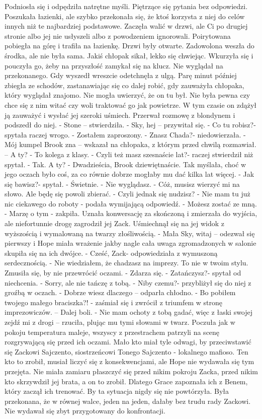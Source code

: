 \documentclass[12pt,a4paper]{book}
\begin{document}
Podniosła się i odpędziła natrętne myśli. Piętrzące się pytania bez odpowiedzi. Poszukała łazienki, ale szybko przekonała się, że ktoś korzysta z niej do celów innych niż te najbardziej podstawowe. Zaczęła walić w drzwi, ale Ci po drugiej stronie albo jej nie usłyszeli albo z powodzeniem ignorowali. Poirytowana pobiegła na górę i trafiła na łazienkę. Drzwi były otwarte. Zadowolona weszła do środka, ale nie była sama. Jakiś chłopak sikał, lekko się chwiejąc. Wkurzyła się i pouczyła go, żeby na przyszłość zamykał się na klucz. Nie wyglądał na przekonanego. Gdy wyszedł wreszcie odetchnęła z ulgą. Parę minut później zbiegła ze schodów, zastanawiając się co dalej robić, gdy zauważyła chłopaka, który wyglądał znajomo. Nie mogła uwierzyć, że on tu był. Nie była pewna czy chce się z nim witać czy woli traktować go jak powietrze. W tym czasie on zdążył ją zauważyć i wysłać jej szeroki uśmiech. Przerwał rozmowę z blondynem i podszedł do niej. 
- Stone – stwierdziła. 
- Sky, hej – przywitał się.
- Co tu robisz?- spytała raczej wrogo. 
- Zostałem zaproszony. 
- Znasz Chada?- niedowierzała.
- Mój kumpel Brook zna – wskazał na chłopaka, z którym przed chwilą rozmawiał. – A ty?
- To kolega z klasy. 
- Czyli też masz szesnaście lat?- raczej stwierdził niż spytał. 
- Tak. A ty?
- Dwadzieścia, Brook dziewiętnaście. 
Tak myślała, choć w jego oczach było coś, za co równie dobrze mogłaby mu dać kilka lat więcej. 
- Jak się bawisz?- spytał. 
- Świetnie. 
- Nie wyglądasz.
- Cóż, musisz wierzyć mi na słowo. Ale będę się powoli zbierać. 
- Czyli jednak się nudzisz?
- Nie mam tu już nic ciekawego do roboty - podała wymijającą odpowiedź.
- Możesz zostać ze mną. 
- Marzę o tym - zakpiła.
Uznała konwersację za skończoną i zmierzała do wyjścia, ale niefortunnie drogę zagrodził jej Zack. Uśmiechnął się na jej widok z wyższością i wymalowaną na twarzy złośliwością. 
- Mała Sky, witaj – odezwał się pierwszy i Hope miała wrażenie jakby nagle cała uwaga zgromadzonych w salonie skupiła się na ich dwójce. 
- Cześć, Zack- odpowiedziała z wymuszoną serdecznością. 
- Nie wiedziałem, że chadzasz na imprezy. To nie w twoim stylu. 
Zmusiła się, by nie przewrócić oczami. 
- Zdarza się. 
- Zatańczysz?- spytał od niechcenia. 
- Sorry, ale nie tańczę z tobą. 
- Niby czemu?- przybliżył się do niej z groźbą w oczach.
- Dobrze wiesz dlaczego – odparła chłodno. 
- Bo pobiłem twojego małego braciszka?! - zaśmiał się i zwrócił z triumfem w stronę imprezowiczów. – Dalej boli.
- Nie mam ochoty z tobą gadać, więc z łaski swojej zejdź mi z drogi – rzuciła, plując mu tymi słowami w twarz. 
Poczuła jak w pokoju temperatura maleje, wszyscy z przestrachem patrzyli na scenę rozgrywającą się przed ich oczami. Mało kto miał tyle odwagi, by przeciwstawić się Zackowi Sajczento, siostrzeńcowi Tonego Sajczento - lokalnego mafioso. Ten kto to zrobił, musiał liczyć się z konsekwencjami, ale Hope nie wydawała się tym przejęta. Nie miała zamiaru płaszczyć się przed nikim pokroju Zacka, przed nikim kto skrzywdził jej brata, a on to zrobił. Dlatego Grace zapoznała ich z Benem, który zaczął ich trenować. By ta sytuacja nigdy się nie powtórzyła. Była przekonana, że w równej walce, jeden na jeden, dałaby bez trudu rady Zackowi. Nie wydawał się zbyt przygotowany do konfrontacji. 
\end{document}
